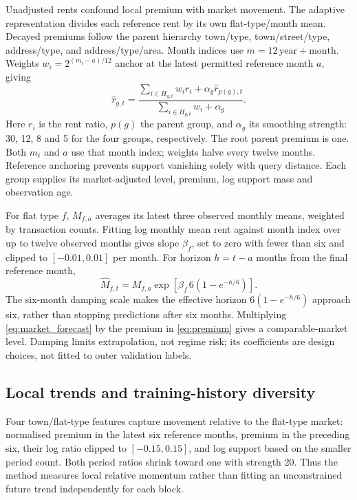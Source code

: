 \documentclass[conference]{IEEEtran}
\begin{document}
Unadjusted rents confound local premium with market movement. The adaptive representation divides each reference rent by its own flat-type/month mean. Decayed premiums follow the parent hierarchy town/type, town/street/type, address/type, and address/type/area. Month indices use $m=12\,\mathrm{year}+\mathrm{month}$. Weights $w_i=2^{(m_i-a)/12}$ anchor at the latest permitted reference month $a$, giving
\begin{equation}
\widehat r_{g,t}=\frac{\sum_{i\in H_{g,t}}w_i r_i+\alpha_g\widehat r_{p(g),t}}{\sum_{i\in H_{g,t}}w_i+\alpha_g}.
\label{eq:premium}
\end{equation}
Here $r_i$ is the rent ratio, $p(g)$ the parent group, and $\alpha_g$ its smoothing strength: 30, 12, 8 and 5 for the four groups, respectively. The root parent premium is one. Both $m_i$ and $a$ use that month index; weights halve every twelve months. Reference anchoring prevents support vanishing solely with query distance. Each group supplies its market-adjusted level, premium, log support mass and observation age.

For flat type $f$, $M_{f,a}$ averages its latest three observed monthly means, weighted by transaction counts. Fitting log monthly mean rent against month index over up to twelve observed months gives slope $\beta_f$, set to zero with fewer than six and clipped to $[-0.01,0.01]$ per month. For horizon $h=t-a$ months from the final reference month,
\begin{equation}
\widehat M_{f,t}=M_{f,a}\exp\!\left[\beta_f\,6(1-e^{-h/6})\right].
\label{eq:market_forecast}
\end{equation}
The six-month damping scale makes the effective horizon $6(1-e^{-h/6})$ approach six, rather than stopping predictions after six months. Multiplying \eqref{eq:market_forecast} by the premium in \eqref{eq:premium} gives a comparable-market level. Damping limits extrapolation, not regime risk; its coefficients are design choices, not fitted to outer validation labels.

\subsection{Local trends and training-history diversity}
Four town/flat-type features capture movement relative to the flat-type market: normalised premium in the latest six reference months, premium in the preceding six, their log ratio clipped to $[-0.15,0.15]$, and log support based on the smaller period count. Both period ratios shrink toward one with strength 20. Thus the method measures local relative momentum rather than fitting an unconstrained future trend independently for each block.
\end{document}
